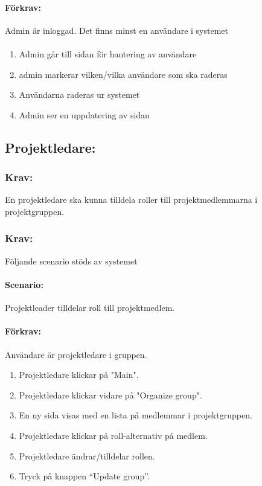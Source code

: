 \documentclass[paper=a4, fontsize=11pt,twoside]{article}
\begin{document}
\paragraph{Förkrav:}
Admin är inloggad. Det finns minst en användare i systemet
\paragraph{}
\begin{enumerate}
\item Admin går till sidan för hantering av användare
\item admin markerar vilken/vilka användare som ska raderas
\item Användarna raderas ur systemet
\item Admin ser en uppdatering av sidan
\end{enumerate}

\subsection{Projektledare:}

\subsubsection*{Krav:} En projektledare ska kunna tilldela roller till projektmedlemmarna i projektgruppen.

\subsubsection*{Krav:}
Följande scenario stöds av systemet
\paragraph{Scenario:}
Projektleader tilldelar roll till projektmedlem.
\paragraph{Förkrav:}
Användare är projektledare i gruppen.
\begin{enumerate} 
\item Projektledare klickar på "Main".
\item Projektledare klickar vidare på "Organize group".
\item En ny sida visas med en lista på medlemmar i projektgruppen.
\item Projektledare klickar på roll-alternativ på medlem.
\item Projektledare ändrar/tilldelar rollen.
\item Tryck på knappen “Update group”.
\end{enumerate}
\end{document}
